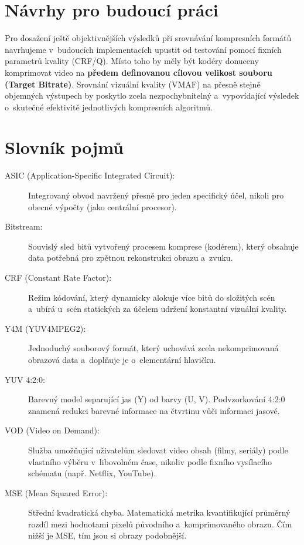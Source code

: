 \documentclass[11pt,a4paper]{article}
\begin{document}
\section*{Návrhy pro budoucí práci}
Pro dosažení ještě objektivnějších výsledků při srovnávání kompresních formátů navrhujeme v~budoucích implementacích upustit od testování pomocí fixních parametrů kvality (CRF/Q). Místo toho by měly být kodéry donuceny komprimovat video na \textbf{předem definovanou cílovou velikost souboru (Target Bitrate)}. Srovnání vizuální kvality (VMAF) na přesně stejně objemných výstupech by poskytlo zcela nezpochybnitelný a~vypovídající výsledek o~skutečné efektivitě jednotlivých kompresních algoritmů.

\newpage
\section*{Slovník pojmů}
\label{sec:glossary}
\begin{description}
    \item[ASIC (Application-Specific Integrated Circuit):] Integrovaný obvod navržený přesně pro jeden specifický účel, nikoli pro obecné výpočty (jako centrální procesor).
    \item[Bitstream:] Souvislý sled bitů vytvořený procesem komprese (kodérem), který obsahuje data potřebná pro zpětnou rekonstrukci obrazu a~zvuku.
    \item[CRF (Constant Rate Factor):] Režim kódování, který dynamicky alokuje více bitů do složitých scén a~ubírá u~scén statických za účelem udržení konstantní vizuální kvality.
    \item[Y4M (YUV4MPEG2):] Jednoduchý souborový formát, který uchovává zcela nekomprimovaná obrazová data a~doplňuje je o~elementární hlavičku. 
    \item[YUV 4:2:0:] Barevný model separující jas (Y) od barvy (U, V). Podvzorkování 4:2:0 znamená redukci barevné informace na čtvrtinu vůči informaci jasové.
    \item[VOD (Video on Demand):] Služba umožňující uživatelům sledovat video obsah (filmy, seriály) podle vlastního výběru v~libovolném čase, nikoliv podle fixního vysílacího schématu (např. Netflix, YouTube).
    \item[MSE (Mean Squared Error):] Střední kvadratická chyba. Matematická metrika kvantifikující průměrný rozdíl mezi hodnotami pixelů původního a~komprimovaného obrazu. Čím nižší je MSE, tím jsou si obrazy podobnější.
\end{description}
\end{document}
